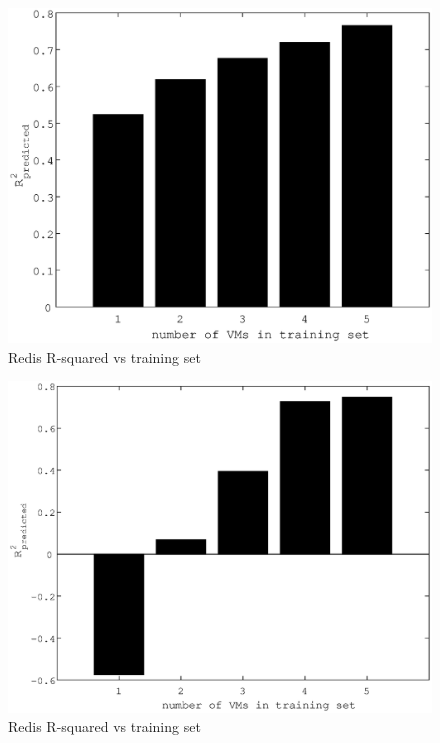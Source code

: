 \documentclass{acm_proc_article-sp}
\begin{document}
\begin{figure}
\centering
\includegraphics[scale = 0.5]{bar_read_avg_latency_r3_2x_r3__m3_2x_m3__r3_x_m3_x.eps}
\caption{Redis R-squared vs training set}
\label{figure:redisbarread}
\end{figure}


\begin{figure}
\centering
\includegraphics[scale = 0.5]{redis_write_bar.eps}
\caption{Redis R-squared vs training set}
\label{figure:redisbarwrite}
\end{figure}
\end{document}
